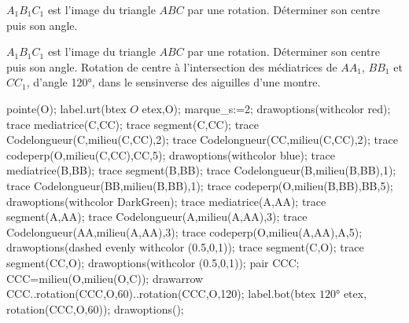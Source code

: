 \begin{exercice*}
    $A_1B_1C_1$ est l'image du triangle $ABC$ par une rotation. Déterminer son centre puis son angle.
    \hspace*{-10mm}
    \begin{Geometrie}[CoinHD={(9u,7u)}]        
        \enonceTroisiemeGTroisExoDouze
    \end{Geometrie}
\end{exercice*}
\begin{corrige}
    $A_1B_1C_1$ est l'image du triangle $ABC$ par une rotation. Déterminer son centre puis son angle.
    {\red Rotation de centre à l'intersection des médiatrices de $AA_1$, $BB_1$ et $CC_1$, d'angle \ang{120}, dans le sensinverse des aiguilles d'une montre.}

    \hspace*{-10mm}
    \begin{Geometrie}[CoinHD={(9u,7u)}]
        \enonceTroisiemeGTroisExoDouze
        pointe(O);
        label.urt(btex $O$ etex,O);
        marque_s:=2;
        drawoptions(withcolor red);
        trace mediatrice(C,CC);
        trace segment(C,CC);
        trace Codelongueur(C,milieu(C,CC),2);
        trace Codelongueur(CC,milieu(C,CC),2);
        trace codeperp(O,milieu(C,CC),CC,5);
        drawoptions(withcolor blue);
        trace mediatrice(B,BB);
        trace segment(B,BB);
        trace Codelongueur(B,milieu(B,BB),1);
        trace Codelongueur(BB,milieu(B,BB),1);
        trace codeperp(O,milieu(B,BB),BB,5);
        drawoptions(withcolor DarkGreen);
        trace mediatrice(A,AA);
        trace segment(A,AA);
        trace Codelongueur(A,milieu(A,AA),3);
        trace Codelongueur(AA,milieu(A,AA),3);
        trace codeperp(O,milieu(A,AA),A,5);
        drawoptions(dashed evenly withcolor (0.5,0,1));
        trace segment(C,O);
        trace segment(CC,O);
        drawoptions(withcolor (0.5,0,1));
        pair CCC;
        CCC=milieu(O,milieu(O,C));
        drawarrow CCC..rotation(CCC,O,60)..rotation(CCC,O,120);
        label.bot(btex $\ang{120}$ etex, rotation(CCC,O,60));
        drawoptions();    
    \end{Geometrie}
    \vspace*{-12mm}
\end{corrige}


